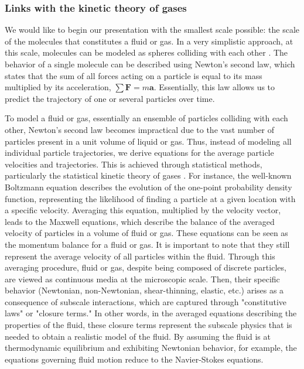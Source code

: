 \subsubsection{Links with the kinetic theory of gases}

We would like to begin our presentation with the smallest scale possible: the scale of the molecules that constitutes a fluid or gas.
In a very simplistic approach, at this scale, molecules can be modeled as spheres colliding with each other \citet{kardar2007statistical}. 
The behavior of a single molecule can be described using Newton's second law, which states that the sum of all forces acting on a particle is equal to its mass multiplied by its acceleration, $\sum\textbf{F} = m \textbf{a}$. 
Essentially, this law allows us to predict the trajectory of one or several particles over time. 


To model a fluid or gas, essentially an ensemble of particles colliding with each other, Newton's second law becomes impractical due to the vast number of particles present in a unit volume of liquid or gas.
Thus, instead of modeling all individual particle trajectories, we derive equations for the average particle velocities and trajectories.
This is achieved through statistical methods, particularly the statistical kinetic theory of gases \cite{hansen2013theory,kardar2007statistical}.
For instance, the well-known Boltzmann equation describes the evolution of the one-point probability density function, representing the likelihood of finding a particle at a given location with a specific velocity.
Averaging this equation, multiplied by the velocity vector, leads to the Maxwell equations, which describe the balance of the averaged velocity of particles in a volume of fluid or gas.
These equations can be seen as the momentum balance for a fluid or gas.
It is important to note that they still represent the average velocity of all particles within the fluid.
Through this averaging procedure, fluid or gas, despite being composed of discrete particles, are viewed as continuous media at the microscopic scale.
Then, their specific behavior (Newtonian, non-Newtonian, shear-thinning, elastic, etc.) arises as a consequence of subscale interactions, which are captured through "constitutive laws" or "closure terms."
In other words, in the averaged equations describing the properties of the fluid, these closure terms represent the subscale physics that is needed to obtain a realistic model of the fluid.
By assuming the fluid is at thermodynamic equilibrium and exhibiting Newtonian behavior, for example, the equations governing fluid motion reduce to the Navier-Stokes equations. 

